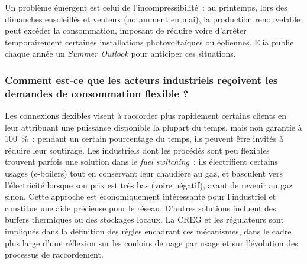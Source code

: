 Un problème émergent est celui de l'incompressibilité~: au printemps, lors des dimanches ensoleillés et venteux (notamment en mai), la production renouvelable peut excéder la consommation, imposant de réduire voire d'arrêter temporairement certaines installations photovoltaïques ou éoliennes. Elia publie chaque année un \textit{Summer Outlook} pour anticiper ces situations.

\subsubsection{Comment est-ce que les acteurs industriels reçoivent les demandes de consommation flexible ?}

Les connexions flexibles visent à raccorder plus rapidement certains clients en leur attribuant une puissance disponible la plupart du temps, mais non garantie à 100~\%~: pendant un certain pourcentage du temps, ils peuvent être invités à réduire leur soutirage. Les industriels dont les procédés sont peu flexibles trouvent parfois une solution dans le \textit{fuel switching}~: ils électrifient certains usages (e-boilers) tout en conservant leur chaudière au gaz, et basculent vers l'électricité lorsque son prix est très bas (voire négatif), avant de revenir au gaz sinon. Cette approche est économiquement intéressante pour l'industriel et constitue une aide précieuse pour le réseau. D'autres solutions incluent des buffers thermiques ou des stockages locaux. La CREG et les régulateurs sont impliqués dans la définition des règles encadrant ces mécanismes, dans le cadre plus large d'une réflexion sur les couloirs de nage par usage et sur l'évolution des processus de raccordement.
